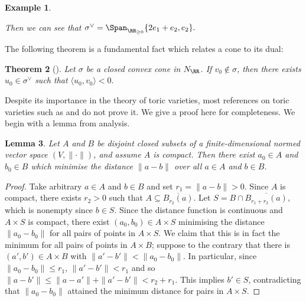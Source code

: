 \documentclass[12pt]{amsart}
\theoremstyle{plain}
\newtheorem{theorem}{Theorem}%
\newtheorem{lemma}[theorem]{Lemma}
\newtheorem{example}[theorem]{Example}
\begin{document}
\begin{example}
\begin{enumerate}
\begin{figure}[H]
\end{figure}
\noindent
Then we can see that $\sigma^\vee = \Span_{\RR_{\ge 0}} \{2 e_1 + e_2, e_2\}.$
\end{enumerate}
\end{example}

The following theorem is a fundamental fact which relates a cone to its dual:

\begin{theorem}[{\cite[\S 1.2]{Fulton93}}]\label{dualitythm}
Let $\sigma$ be a closed convex cone in $N_\RR$.
If $v_0 \notin \sigma$, then there exists $u_0 \in \sigma^\vee$ such that $\langle u_0, v_0 \rangle <0.$
\end{theorem}

Despite its importance in the theory of toric varieties, most references on toric varieties such as \cite{Fulton93} and \cite{CLS11} do not prove it.
We give a proof here for completeness.
We begin with a lemma from analysis.

\begin{lemma}\label{mindistancelemma}
Let $A$ and $B$ be disjoint closed subsets of a finite-dimensional normed vector space $(V, \|\cdot\|)$, and assume $A$ is compact.
Then there exist $a_0 \in A$ and $b_0 \in B$ which minimise the distance $\|a-b\|$ over all $a \in A$ and $b \in B$.
\end{lemma}
\begin{proof}
Take arbitrary $a \in A$ and $b \in B$ and set $r_1 = \|a-b\| > 0$.
Since $A$ is compact, there exists $r_2 > 0$ such that $A \subseteq \overline{B_{r_2}(a)}$.
Let
$S = B \cap \overline{B_{r_1+r_2}(a)},$
which is nonempty since $b \in S$.
Since the distance function is continuous and $A \times S$ is compact, there exist $(a_0, b_0) \in A \times S$ minimising the distance $\|a_0 - b_0\|$ for all pairs of points in $A \times S$.
We claim that this is in fact the minimum for all pairs of points in $A \times B$; 
suppose to the contrary that there is $(a', b') \in A \times B$ with $\|a' - b'\| < \|a_0 - b_0\|$. 
In particular, since $\|a_0 - b_0\|\le r_1$, $\|a' - b'\| < r_1$ and so
$\|a - b'\| \le \|a - a'\| + \|a' - b'\| < r_2 + r_1.$
This implies $b' \in S$, contradicting that $\|a_0-b_0\|$ attained the minimum distance for pairs in $A \times S$.
\end{proof}
\end{document}

